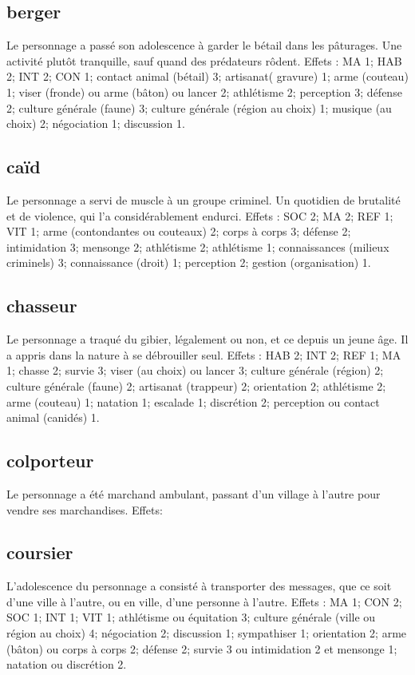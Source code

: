 \documentclass[10pt,a4paper,twocolumn]{book}
\begin{document}
\subsection*{berger}
Le personnage a passé son adolescence à garder le bétail dans les pâturages. Une activité plutôt tranquille, sauf quand des prédateurs rôdent.
Effets : MA 1; HAB 2; INT 2; CON 1; contact animal (bétail) 3; artisanat( gravure) 1; arme (couteau) 1; viser (fronde) ou arme (bâton) ou lancer 2; athlétisme 2; perception 3; défense 2; culture générale (faune) 3; culture générale (région au choix) 1; musique (au choix) 2; négociation 1; discussion 1.
\subsection*{caïd}
Le personnage a servi de muscle à un groupe criminel. Un quotidien de brutalité et de violence, qui l’a considérablement endurci.
Effets : SOC 2; MA 2; REF 1; VIT 1; arme (contondantes ou couteaux) 2; corps à corps 3; défense 2; intimidation 3; mensonge 2; athlétisme 2; athlétisme 1; connaissances (milieux criminels) 3; connaissance (droit) 1; perception 2; gestion (organisation) 1.
\subsection*{chasseur}
Le personnage a traqué du gibier, légalement ou non, et ce depuis un jeune âge. Il a appris dans la nature à se débrouiller seul.
Effets : HAB 2; INT 2; REF 1; MA 1; chasse 2; survie 3; viser (au choix) ou lancer 3; culture générale (région) 2; culture générale (faune) 2; artisanat (trappeur) 2; orientation 2; athlétisme 2; arme (couteau) 1; natation 1; escalade 1; discrétion 2; perception ou contact animal (canidés) 1.
\subsection*{colporteur}
Le personnage a été marchand ambulant, passant d’un village à l’autre pour vendre ses marchandises.
Effets: 
\subsection*{coursier}
L’adolescence du personnage a consisté à transporter des messages, que ce soit d’une ville à l’autre, ou en ville, d’une personne à l’autre.
Effets : MA 1; CON 2; SOC 1; INT 1; VIT 1; athlétisme ou équitation 3; culture générale (ville ou région au choix) 4; négociation 2; discussion 1; sympathiser 1; orientation 2; arme (bâton) ou corps à corps 2; défense 2; survie 3 ou intimidation 2 et mensonge 1; natation ou discrétion 2.
\end{document}
